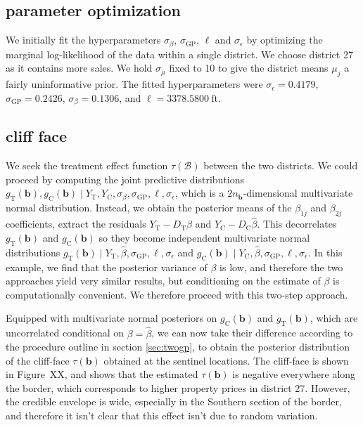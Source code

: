 \documentclass[letter]{article}
\newcommand{\treat}{\mathrm{T}}
\newcommand{\ctrol}{\mathrm{C}}
\newcommand{\sigmaf}{\sigma_{\mathrm{GP}}}
\newcommand{\sigman}{\sigma_{\epsilon}}
\newcommand{\boundary}{\mathcal{B}}
\newcommand{\sentinels}{\bm{b}}
\newcommand{\numsent}{n_{\sentinels}}
\begin{document}
    	\subsection{parameter optimization}\label{parameter-optimization}

We initially fit the hyperparameters \(\sigma_\beta\), \(\sigmaf\), \(\ell\) and \(\sigman\) by optimizing the marginal log-likelihood of the data within a single district. We choose district 27 as it contains more sales. We hold \(\sigma_\mu\) fixed to 10 to give the district means \(\mu_j\) a fairly uninformative prior. The fitted hyperparameters were \(\sigman=0.4179\), \(\sigmaf=0.2426\), \(\sigma_\beta=0.1306\), and \(\ell=3378.5800~\text{ft}\).
    


    	\subsection{cliff face}\label{cliff-face}

We seek the treatment effect function \(\tau(\boundary)\) between the two districts. We could proceed by computing the joint predictive distributions \(g_\treat{}(\sentinels),g_\ctrol{}(\sentinels) \mid Y_\treat{}, Y_\ctrol{}, \sigma_\beta,\sigmaf,\ell,\sigman\), which is a \(2 \numsent\)-dimensional multivariate normal distribution. Instead, we obtain the posterior means of the \(\beta_{1j}\) and \(\beta_{2j}\) coefficients, extract the residuals \(Y_\treat{}-D_\treat{} \hat{\beta}\) and \(Y_\ctrol{}-D_\ctrol{} \hat{\beta}\). This decorrelates \(g_\treat{}(\sentinels)\) and \(g_\ctrol{}(\sentinels)\) so they become independent multivariate normal distributions \(g_\treat{}(\sentinels) \mid Y_\treat{}, \hat\beta, \sigmaf,\ell,\sigman\) and \(g_\ctrol{}(\sentinels) \mid Y_\ctrol{}, \hat\beta, \sigmaf,\ell,\sigman\). In this example, we find that the posterior variance of \(\beta\) is low, and therefore the two approaches yield very similar results, but conditioning on the estimate of \(\beta\) is computationally convenient. We therefore proceed with this two-step approach.

Equipped with multivariate normal posteriors on \(g_\ctrol{}(\sentinels)\) and \(g_\treat{}(\sentinels)\), which are uncorrelated conditional on \(\beta=\hat\beta\), we can now take their difference according to the procedure outline in section \ref{sec:twogp}, to obtain the posterior distribution of the cliff-face \(\tau(\sentinels)\) obtained at the sentinel locations.
The cliff-face is shown in Figure~XX, and shows that the estimated \(\tau(\sentinels)\) is negative everywhere along the border, which corresponds to higher property prices in district 27.
However, the credible envelope is wide, especially in the Southern section of the border, and therefore it isn't clear that this effect isn't due to random variation.
\end{document}
